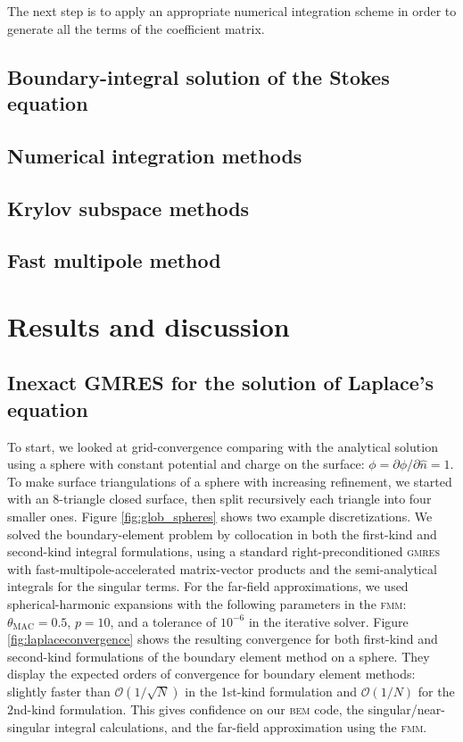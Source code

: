 \documentclass[final,leqno,]{siamltex1213}
\newcommand{\bem}{\textsc{bem}\xspace}
\newcommand{\fmm}{\textsc{fmm}\xspace}
\renewcommand{\O}[1]{\mathcal{O}(#1)}
\newcommand{\gmres}{\textsc{gmres}\xspace}
\newcommand{\partialdi}[2]{\partial #1 / \partial #2}
\newcommand{\nhat}{\hat{n}}
\begin{document}
The next step is to apply an appropriate numerical integration scheme in order to generate all the terms of the coefficient matrix.

\subsection{Boundary-integral solution of the Stokes equation}

\subsection{Numerical integration methods}

\subsection{Krylov subspace methods}

\subsection{Fast multipole method}

\section{Results and discussion}

\subsection{Inexact {\small GMRES} for the solution of Laplace's equation}
To start, we looked at grid-convergence comparing with the analytical solution using a sphere with constant potential and charge on the surface: $\phi = \partialdi{\phi}{\nhat} = 1$. To make surface triangulations of a sphere with increasing refinement, we started with an 8-triangle closed surface, then split recursively each triangle into four smaller ones. Figure \ref{fig:glob_spheres} shows two example discretizations. We solved the boundary-element problem by collocation in both the first-kind and second-kind integral formulations, using a standard right-preconditioned \gmres with fast-multipole-accelerated matrix-vector products and the semi-analytical integrals for the singular terms. For the far-field approximations, we used spherical-harmonic expansions with the following parameters in the \fmm: $\theta_{\text{MAC}} = 0.5$, $p = 10$, and a tolerance of $10^{-6}$ in the iterative solver. 
Figure \ref{fig:laplaceconvergence} shows the resulting convergence for both first-kind and second-kind formulations of the boundary element method on a sphere. They display the expected orders of convergence for boundary element methods: slightly faster than $\O{1/\sqrt{N}}$ in the 1st-kind formulation and $\O{1/N}$ for the 2nd-kind formulation. This gives confidence on our \bem code, the singular/near-singular integral calculations, and the far-field approximation using the \fmm.
\end{document}
